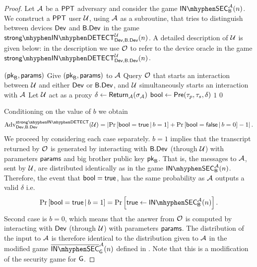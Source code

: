 \begin{proof}
		Let $\mathcal{A}$ be a $\mathsf{PPT}$ adversary and consider the game $\insecgame_{\bb}^{\adve}(n)$. We construct a $\mathsf{PPT}$ user $\user$, using $\mathcal{A}$ as a subroutine, that tries to distinguish between devices $\operatorname{\mathsf{Dev}}$ and $\mathsf{B}.\mathsf{Dev}$ in the game $\instrongdetect{\dev}{\bbdev}{\user}$. A detailed description of $\user$ is given below: in the description we use $\operatorname{\mathcal{O}}$ to refer to the device oracle in the game $\instrongdetect{\dev}{\bbdev}{\user}$.
	
\begin{Algorithm}[]{6cm}
\captionUser
\caption{$\user$}
\label{alg:interactiveRedundantUser}
\begin{algorithmic}[1]
\Require $(\mathsf{pk}_{\mathsf{B}},\mathsf{params})$
\State Give $(\mathsf{pk}_{\mathsf{B}},\mathsf{params})$ to $\mathcal{A}$
\State Query $\operatorname{\mathcal{O}}$ that starts an interaction between $\user$ and either $\operatorname{\mathsf{Dev}}$ or $\mathsf{B}.\mathsf{Dev}$, and $\user$ simultaneously starts an interaction with $\mathcal{A}$
\State Let $\user$ act as a proxy 
\State $\delta \leftarrow \operatorname{\mathsf{Return}}_{\mathcal{A}}(\sigma_{\mathcal{A}})$
\State $\mathsf{bool} \leftarrow \operatorname{\mathsf{Pre}}(\tau_p,\tau_s,\delta)$
\If{$\bool = \true$}
\State \Ret $1$
\Else
\State \Ret $0$
\EndIf
\end{algorithmic}
\end{Algorithm} 

Conditioning on the value of $b$ we obtain
\begin{align}
\label{eq:2}
	\adv_{\dev,\bbdev}^{\instrongdetectplain}(\user) = \left\vert \condprob{\bool = \true}{b = 1} + \condprob{\bool = \false}{b = 0} -1 \right\vert.
\end{align}
We proceed by considering each case separately. $b = 1$ implies that the transcript returned by $\operatorname{\mathcal{O}}$ is generated by interacting with $\mathsf{B}.\mathsf{Dev}$ (through $\user$) with parameters $\mathsf{params}$ and big brother public key $\mathsf{pk}_{\mathsf{B}}$. That is, the messages to $\mathcal{A}$, sent by $\user$, are distributed identically as in the game $\insecgame_{\bb}^{\adve}(n)$. Therefore, the event that $\bool = \true$, has the same probability as $\mathcal{A}$ outputs a valid $\delta$ i.e.
\begin{align}
\label{eq:3}
	\condprob{\bool = \true}{b = 1} = \prob{\true \leftarrow \insecgame_{\bb}^{\adve}(n)}.
\end{align}
Second case is $b = 0$, which means that the answer from $\operatorname{\mathcal{O}}$ is computed by interacting with $\operatorname{\mathsf{Dev}}$ (through $\user$) with parameters $\mathsf{params}$. The distribution of the input to $\mathcal{A}$ is therefore identical to the distribution given to $\mathcal{A}$ in the modified game $\pneg{\insecgame}_{\cgame}^{\adve}(n)$ defined in . Note that this is a modification of the security game for $\operatorname{\mathsf{G}}$.


\end{proof}
